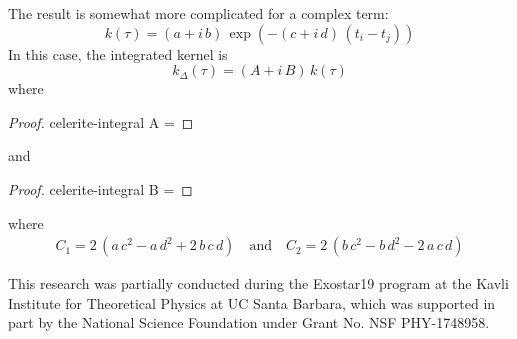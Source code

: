 \documentclass[modern]{aastex62}
\begin{document}
The result is somewhat more complicated for a complex term:
\begin{equation}
k(\tau) = (a + i\,b)\,\exp\left(-(c+i\,d)\,(t_i - t_j)\right)
\end{equation}
In this case, the integrated kernel is
\begin{equation}
k_\Delta(\tau) = (A + i\,B)\,k(\tau)
\end{equation}
where
\begin{proof}{celerite-integral}
  A = 
\end{proof}
and
\begin{proof}{celerite-integral}
  B = 
\end{proof}
where
\begin{eqnarray}
C_1 = 2\,(a\,c^2 - a\,d^2 + 2\,b\,c\,d)
\quad\mathrm{and}\quad
C_2 = 2\,(b\,c^2 - b\,d^2 - 2\,a\,c\,d)
\end{eqnarray}

\newpage
\acknowledgements

This research was partially conducted during the Exostar19 program at the Kavli Institute for Theoretical Physics at UC Santa Barbara, which was supported in part by the National Science Foundation under Grant No. NSF PHY-1748958.

\newpage

\end{document}
